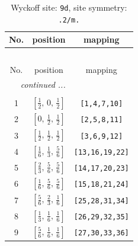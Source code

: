 \documentclass[fleqn,8pt]{jsarticle}
\begin{document}
\begin{longtable}{ccc}
\caption{Wyckoff site: {\tt 9d}, site symmetry: {\tt .2/m.}}
 \\
 \hline \hline
No. & position & mapping \\ \hline \endfirsthead

\multicolumn{2}{l}{\tablename\ \thetable{}} \\
 \hline \hline
No. & position & mapping \\ \hline \endhead

 \hline \hline
\multicolumn{2}{r}{\footnotesize\it continued ...} \\ \endfoot

 \hline \hline
\multicolumn{2}{r}{} \\ \endlastfoot

1 & $\left[ \frac{1}{2},\, 0,\, \frac{1}{2} \right]$ & {\tt [1,4,7,10]} \\ \hline
2 & $\left[ 0,\, \frac{1}{2},\, \frac{1}{2} \right]$ & {\tt [2,5,8,11]} \\ \hline
3 & $\left[ \frac{1}{2},\, \frac{1}{2},\, \frac{1}{2} \right]$ & {\tt [3,6,9,12]} \\ \hline
4 & $\left[ \frac{1}{6},\, \frac{1}{3},\, \frac{5}{6} \right]$ & {\tt [13,16,19,22]} \\ \hline
5 & $\left[ \frac{2}{3},\, \frac{5}{6},\, \frac{5}{6} \right]$ & {\tt [14,17,20,23]} \\ \hline
6 & $\left[ \frac{1}{6},\, \frac{5}{6},\, \frac{5}{6} \right]$ & {\tt [15,18,21,24]} \\ \hline
7 & $\left[ \frac{5}{6},\, \frac{2}{3},\, \frac{1}{6} \right]$ & {\tt [25,28,31,34]} \\ \hline
8 & $\left[ \frac{1}{3},\, \frac{1}{6},\, \frac{1}{6} \right]$ & {\tt [26,29,32,35]} \\ \hline
9 & $\left[ \frac{5}{6},\, \frac{1}{6},\, \frac{1}{6} \right]$ & {\tt [27,30,33,36]} \\
\end{longtable}
\renewcommand{\arraystretch}{1.2}
\end{document}

